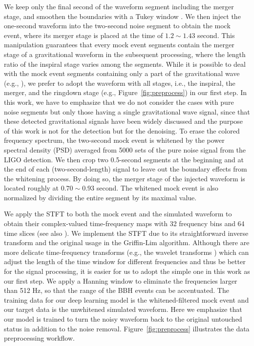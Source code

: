 \documentclass[preprint,12pt]{elsarticle}
\begin{document}
We keep only the final second of the waveform segment including the merger stage, and smoothen the boundaries with a Tukey window \cite{harris2005use}. We then inject the one-second waveform into the two-second noise segment to obtain the mock event, where its merger stage is placed at the time of $1.2\sim 1.43$ second. 
This manipulation guarantees that every mock event segments contain the merger stage of a gravitational waveform in the subsequent processing, where the length ratio of the inspiral stage varies among the segments.
While it is possible to deal with the mock event segments containing only a part of the gravitational wave (e.g., \cite{wang2024waveformer}), we  prefer to adopt the waveform with all stages, i.e., the inspiral, the merger, and the ringdown stage (e.g., Figure~\ref{fig:preprocess}) in our first step.
In this work, we have to emphasize that we do not consider the cases with pure noise segments but only those having a single gravitational wave signal, since that these detected gravitational signals have been widely discussed \cite{george2018deep, george2018paraest, li2020some, krastev2021detection, mishra2021optimization, jiang2022convolutional, ma2022ensemble, nousi2023deep, qiu2023deep, jadhav2023towards, zhao2023space, bini2023autoencoder, chatterjee2024pre} and the purpose of this work is not for the detection but for the denoising.
To erase the colored frequency spectrum, the two-second mock event is whitened by the power spectral density (PSD) averaged from 5000 sets of the pure noise signal from the LIGO detection.
We then crop two 0.5-second segments at the beginning and at the end of each (two-second-length) signal to leave out the boundary effects from the whitening process. By doing so, the merger stage of the injected waveform is located roughly at $0.70\sim 0.93$ second.
The whitened mock event is also normalized by dividing the entire segment by its maximal value.

We apply the STFT to both the mock event and the simulated waveform to obtain their complex-valued time-frequency maps with 32 frequency bins and 64 time slices (see also \cite{dooney2025deepextractor}).
We implement the STFT due to its straightforward inverse transform \cite{dooney2025deepextractor} and the original usage in the Griffin-Lim algorithm. 
Although there are more delicate time-frequency transforms (e.g., the wavelet transforms \cite{rioul1991wavelets, chatterji2005search, virtuoso2024wavelet}) which can adjust the length of the time window for different frequencies and thus be better for the signal processing, it is easier for us to adopt the simple one in this work as our first step.
We apply a Hanning window \cite{harris2005use} to eliminate the frequencies larger than 512 Hz, so that the range of the BBH events can be accentuated. 
The training data for our deep learning model is the whitened-filtered mock event and our target data is the unwhitened simulated waveform. 
Here we emphasize that our model is trained to turn the noisy waveform back to the original untouched status in addition to the noise removal. 
Figure~\ref{fig:preprocess} illustrates the data preprocessing workflow.
\end{document}
